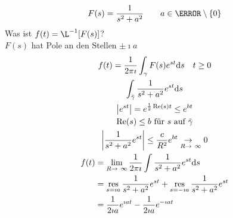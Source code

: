 \begin{bsp*}
	\[ F(s) = \frac{1}{s^2 + a^2} \qquad a \in \C \setminus \{ 0 \} \]
	Was ist $f(t) = \L^{-1}[F(s)]$? \\
	$F(s)$ hat Pole an den Stellen $\pm \imath a$
	\begin{gather*}
		f(t) = \frac{1}{2\pi\imath} \int_{\gamma} F(s) e^{st} \dd s \quad t \geq 0 \\
		\int_{\tilde{\gamma}} \frac{1}{s^2 + a^2} e^{st} \dd s \\
		\abs{e^{st}} = e^{\frac{1}{2} \Re(s) t} \leq e^{bt} \\
		\Re(s) \leq b \text{ für } s \text{ auf } \tilde{\gamma} \\
		\abs{\frac{1}{s^2 + a^2} e^{st}} \leq \frac{c}{R^2} e^{bt} \underset{R \rightarrow \infty}{\rightarrow} 0 \\
		\begin{split}
			f(t)
				&= \lim_{R \rightarrow \infty} \frac{1}{2\pi\imath} \int \frac{1}{s^2 + a^2} e^{st} \dd s \\
				&= \res_{s = \imath a} \frac{1}{s^2 + a^2} e^{st} + \res_{s = -\imath a} \frac{1}{s^2 + a^2} e^{st} \\
				&= \frac{1}{2\imath a} e^{\imath at} - \frac{1}{2\imath a} e^{-\imath at}
		\end{split}
	\end{gather*}
\end{bsp*}

